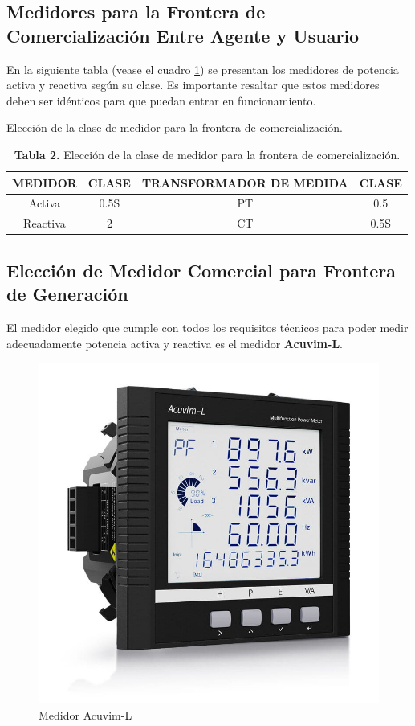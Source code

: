 \subsection{Medidores para la Frontera de Comercialización Entre Agente y Usuario}
En la siguiente tabla (vease el cuadro \ref{tab:clase_medidor_comercializacion}) se presentan los medidores de potencia activa y reactiva según su clase. Es importante resaltar que estos medidores deben ser idénticos para que puedan entrar en funcionamiento.

\begin{table}[H]
    \centering
    \caption{Elección de la clase de medidor para la frontera de comercialización.}
    \label{tab:clase_medidor_comercializacion}
    \begin{tabular}{cccc}
        \toprule
        \textbf{MEDIDOR} & \textbf{CLASE} & \textbf{TRANSFORMADOR DE MEDIDA} & \textbf{CLASE} \\
        \midrule
        Activa & 0.5S & PT & 0.5 \\
        Reactiva & 2 & CT & 0.5S \\
        \bottomrule
    \end{tabular}
    \caption*{\textbf{Tabla 2.} Elección de la clase de medidor para la frontera de comercialización.}
\end{table}

\subsection{Elección de Medidor Comercial para Frontera de Generación}

El medidor elegido que cumple con todos los requisitos técnicos para poder medir adecuadamente potencia activa y reactiva es el medidor \textbf{Acuvim-L}.

\begin{figure}[H]
    \centering
    \includegraphics[width=0.8\columnwidth]{figs/medidor acuvin L.jpg} %
    \caption{Medidor Acuvim-L}
    \label{fig:acuvim_l}
\end{figure}

